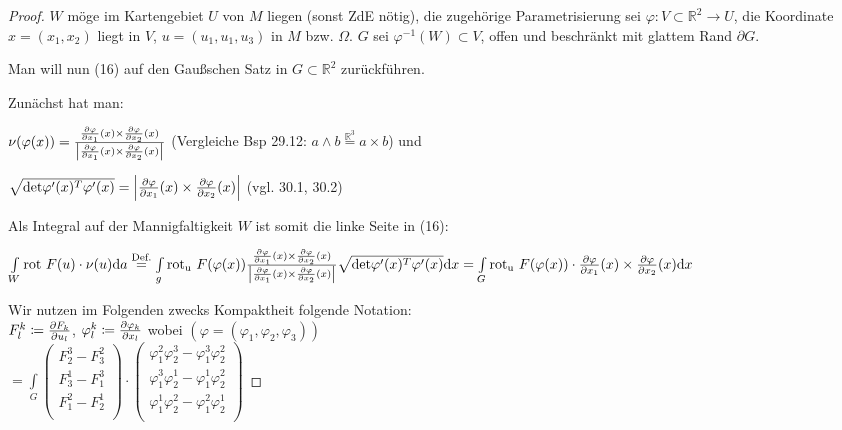 \begin{proof}

$W$ möge im Kartengebiet $U$ von $M$ liegen (sonst ZdE nötig),
die zugehörige Parametrisierung sei $\varphi: V \subset \mathbb{R}^2 \rightarrow U $,
die Koordinate $x = (x_1, x_2) $ liegt in $V$, 
$u = (u_1, u_1, u_3) $ in $M$ bzw. $\Omega$.
$G$ sei $\varphi^{-1} (W) \subset V $, offen und beschränkt mit glattem Rand $\partial G $.

Man will nun (16) auf den Gaußschen Satz in $G \subset \mathbb{R}^2 $ zurückführen.

Zunächst hat man:

$\nu(\varphi(x)) = 
\frac
    {\frac{\partial{\varphi}}{\partial{x_1}} (x) \times \frac{\partial{\varphi}}{\partial{x_2}} (x)}
    {\left| \frac{\partial{\varphi}}{\partial{x_1}} (x) \times \frac{\partial{\varphi}}{\partial{x_2}} (x) \right|}
$
(Vergleiche Bsp 29.12: $a \wedge b \stackrel{\mathbb{R}^3}{=} a \times b $) und

$\sqrt{\mathrm{det } \varphi'(x)^T \varphi'(x)}
=
\left| \frac{\partial{\varphi}}{\partial{x_1}} (x) \times \frac{\partial{\varphi}}{\partial{x_2}} (x) \right| $
(vgl. 30.1, 30.2)

Als Integral auf der Mannigfaltigkeit $W$ ist somit die linke Seite in (16):

$\int\limits_W \mathrm{rot\ } F(u) \cdot \nu(u) \mathrm{d}a \\
\stackrel{\text{Def.}}{=}
\int\limits_g \mathrm{rot_u } \ F(\varphi(x)) 
\frac
    {\frac{\partial{\varphi}}{\partial{x_1}} (x) \times \frac{\partial{\varphi}}{\partial{x_2}} (x)}
    {\left| \frac{\partial{\varphi}}{\partial{x_1}} (x) \times \frac{\partial{\varphi}}{\partial{x_2}} (x) \right|}
\sqrt{\mathrm{det } \varphi'(x)^T \varphi'(x)}
\mathrm{d}x \\
=
\int\limits_G \mathrm{rot_u } \ F(\varphi(x)) \cdot 
\frac{\partial{\varphi}}{\partial{x_1}} (x) \times \frac{\partial{\varphi}}{\partial{x_2}} (x)
\mathrm{d}x $

\leftskip=30pt Wir nutzen im Folgenden zwecks Kompaktheit folgende Notation:\\
$F_l^k \coloneqq \frac{\partial{F_k}}{\partial{u_l}}$,
$\varphi_l^k \coloneqq \frac{\partial{\varphi_k}}{\partial{x_l}} $ wobei 
$(\varphi = (\varphi_1, \varphi_2, \varphi_3)) $\\

\leftskip=0pt
$
=
\int\limits_G
\begin{pmatrix}
    F_2^3 - F_3^2 \\
    F_3^1 - F_1^3 \\
    F_1^2 - F_2^1 \\
\end{pmatrix}
\cdot
\begin{pmatrix}
    \varphi_1^2 \varphi_2^3 - \varphi_1^3 \varphi_2^2\\
    \varphi_1^3 \varphi_2^1 - \varphi_1^1 \varphi_2^2\\
    \varphi_1^1 \varphi_2^2 - \varphi_1^2 \varphi_2^1\\
\end{pmatrix}
$


\end{proof}
